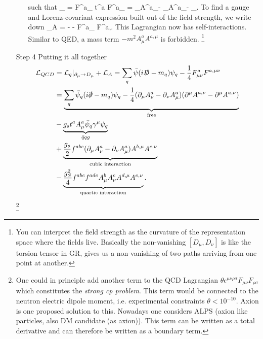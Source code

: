 \begin{enumerate}
\begin{enumerate}
		\ese 
		such that
		\bse 
		\mF_{\mu \nu} = F^a_{\mu \nu} t^a \rightarrow F^a_{\mu \nu} = \partial_\mu A^a_\nu - \partial_\nu A^a_\mu - _{}.
		\ese 
		To find a gauge and Lorenz-covariant expression built out of the field strength, we write down
		\be
		\mL_A = -  \Tr \left[ \mF_{\mu \nu} \mF^{\mu \nu}\right] -  F^a_{\mu \nu} F^{a,\mu \nu}. 
		\ee 
		This Lagrangian now has self-interactions. Similar to QED, a mass term $-m^2 A^a_\mu A^{a,\mu}$ is forbidden.
		\footnote{
		You can interpret the field strength as the curvature of the representation space where the fields live. Basically the non-vanishing $[D_\mu,D_\nu]$ is like the torsion tensor in GR, gives us a non-vanishing of two paths arriving from one point at another.}
	\end{enumerate}
	\item[Step 4] Putting it all together
	\begin{align*}
		\mathcal{L}_{QCD} &= \mathcal{L}_{q}|_{\partial_\mu \rightarrow D_\mu} + \mathcal{L}_A = \sum_q \bar{\psi} (i \slashed{D}-m_q) \psi_q - \frac{1}{4}F^a_{\mu \nu} F^{a,\mu \nu} \\
		&=\underbrace{  \sum_q \bar{\psi}_q (i\slashed{\partial} -m_q)\psi_q - \frac{1}{4} (\partial_\mu A^a_\nu -\partial_\nu A^a_\mu) (\partial^\mu A^{a,\nu} -\partial^\mu A^{a,\nu}) }_{\text{free}} \\
		&- \underbrace{g_s t^a A^a_\mu \bar{\psi}_q \gamma^\mu \psi_q}_{\bar{q} q g} \\
		&+\underbrace{  \frac{g_s}{2} f^{abc} (\partial_\mu A^a_\nu - \partial_\nu A^a_\mu ) A^{b,\mu} A^{c,\nu}}_{\text{cubic interaction}} \\
		&- \underbrace{\frac{g^2_S}{4} f^{abc} f^{ade} A^b_\mu A^c_\nu A^{d,\mu} A^{e,\nu}}_{\text{quartic interaction}}.
	\end{align*}
	\footnote{
	One could in principle add another term to the QCD Lagrangian $
	\theta \epsilon^{\mu \nu \rho \sigma} F_{\mu \nu} F_{\rho \sigma}$
	which constitutes the \emph{strong cp problem}. This term would be connected to the neutron electric dipole moment, i.e. experimental constraints $\theta <10^{-10}$. Axion is one proposed solution to this. Nowadays one considers ALPS (axion like particles, also DM candidate (as axion)). This term can be written as a total derivative and can therefore be written as a boundary term.}
\end{enumerate}

 



